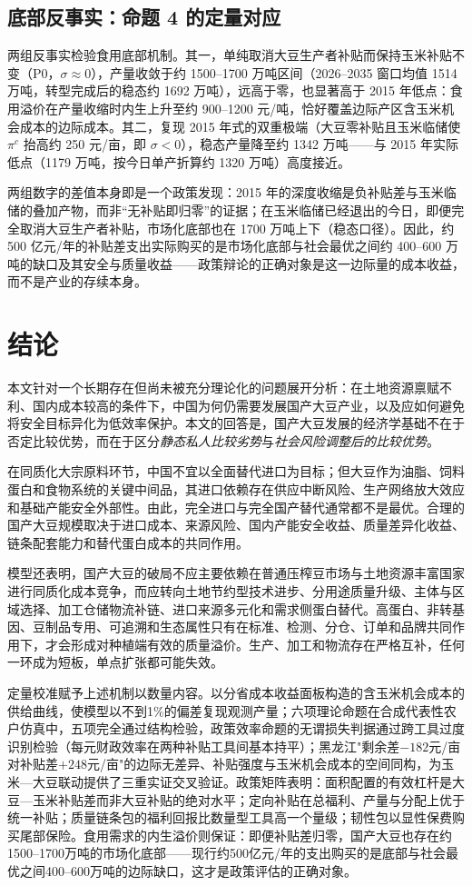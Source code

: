 \documentclass[UTF8,zihao=-4,fontset=fandol]{ctexart}
\numberwithin{equation}{section}
\theoremstyle{definition}
\theoremstyle{remark}
\begin{document}
\subsection{底部反事实：命题 4 的定量对应}

两组反事实检验食用底部机制。其一，单纯取消大豆生产者补贴而保持玉米补贴不变（P0，$\sigma\approx0$），产量收敛于约 1500--1700 万吨区间（2026--2035 窗口均值 1514 万吨，转型完成后的稳态约 1692 万吨），远高于零，也显著高于 2015 年低点：食用溢价在产量收缩时内生上升至约 900--1200 元/吨，恰好覆盖边际产区含玉米机会成本的边际成本。其二，复现 2015 年式的双重极端（大豆零补贴且玉米临储使 $\pi^c$ 抬高约 250 元/亩，即 $\sigma<0$），稳态产量降至约 1342 万吨——与 2015 年实际低点（1179 万吨，按今日单产折算约 1320 万吨）高度接近。

两组数字的差值本身即是一个政策发现：2015 年的深度收缩是负补贴差与玉米临储的叠加产物，而非“无补贴即归零”的证据；在玉米临储已经退出的今日，即便完全取消大豆生产者补贴，市场化底部也在 1700 万吨上下（稳态口径）。因此，约 500 亿元/年的补贴差支出实际购买的是市场化底部与社会最优之间约 400--600 万吨的缺口及其安全与质量收益——政策辩论的正确对象是这一边际量的成本收益，而不是产业的存续本身。

\section{结论}

本文针对一个长期存在但尚未被充分理论化的问题展开分析：在土地资源禀赋不利、国内成本较高的条件下，中国为何仍需要发展国产大豆产业，以及应如何避免将安全目标异化为低效率保护。本文的回答是，国产大豆发展的经济学基础不在于否定比较优势，而在于区分\emph{静态私人比较劣势}与\emph{社会风险调整后的比较优势}。

在同质化大宗原料环节，中国不宜以全面替代进口为目标；但大豆作为油脂、饲料蛋白和食物系统的关键中间品，其进口依赖存在供应中断风险、生产网络放大效应和基础产能安全外部性。由此，完全进口与完全国产替代通常都不是最优。合理的国产大豆规模取决于进口成本、来源风险、国内产能安全收益、质量差异化收益、链条配套能力和替代蛋白成本的共同作用。

模型还表明，国产大豆的破局不应主要依赖在普通压榨豆市场与土地资源丰富国家进行同质化成本竞争，而应转向土地节约型技术进步、分用途质量升级、主体与区域选择、加工仓储物流补链、进口来源多元化和需求侧蛋白替代。高蛋白、非转基因、豆制品专用、可追溯和生态属性只有在标准、检测、分仓、订单和品牌共同作用下，才会形成对种植端有效的质量溢价。生产、加工和物流存在严格互补，任何一环成为短板，单点扩张都可能失效。

定量校准赋予上述机制以数量内容。以分省成本收益面板构造的含玉米机会成本的供给曲线，使模型以不到1\%的偏差复现观测产量；六项理论命题在合成代表性农户仿真中，五项完全通过结构检验，政策效率命题的无谓损失判据通过跨工具过度识别检验（每元财政效率在两种补贴工具间基本持平）；黑龙江"剩余差$-182$元/亩对补贴差$+248$元/亩"的边际无差异、补贴强度与玉米机会成本的空间同构，为玉米—大豆联动提供了三重实证交叉验证。政策矩阵表明：面积配置的有效杠杆是大豆—玉米补贴差而非大豆补贴的绝对水平；定向补贴在总福利、产量与分配上优于统一补贴；质量链条包的福利回报比数量型工具高一个量级；韧性包以显性保费购买尾部保险。食用需求的内生溢价则保证：即便补贴差归零，国产大豆也存在约1500--1700万吨的市场化底部——现行约500亿元/年的支出购买的是底部与社会最优之间400--600万吨的边际缺口，这才是政策评估的正确对象。
\end{document}
